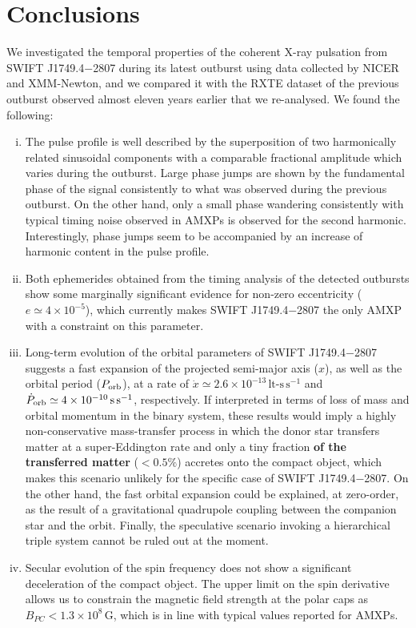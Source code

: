 \documentclass[fleqn,usenatbib]{mnras}
\newcommand{\swiftj}{SWIFT J1749.4$-$2807}
\newcommand{\nicer}{NICER}
\newcommand{\xmm}{XMM-Newton}
\newcommand{\rxte}{RXTE}
\begin{document}
\section{Conclusions}
We investigated the temporal properties of the coherent X-ray pulsation from \swiftj{} during its latest outburst using data collected by \nicer{} and \xmm{}, and we compared it with the \rxte{} dataset of the previous outburst observed almost eleven years earlier that we re-analysed. We found the following:

\begin{enumerate}[i)]
  \item The pulse profile is well described by the superposition of two harmonically related sinusoidal components with a comparable fractional amplitude which varies during the outburst. Large phase jumps are shown by the fundamental phase of the signal consistently to what was observed during the previous outburst. On the other hand, only a small phase wandering consistently with typical timing noise observed in AMXPs is observed for the second harmonic. Interestingly, phase jumps seem to be accompanied by an increase of harmonic content in the pulse profile. 
  \item Both ephemerides obtained from the timing analysis of the detected outbursts show some marginally significant evidence for non-zero eccentricity ($e\simeq4\times 10^{-5}$), which currently makes \swiftj{} the only AMXP with a constraint on this parameter.   
  \item Long-term evolution of the orbital parameters of \swiftj{} suggests a fast expansion of the projected semi-major axis ($x$), as well as the orbital period ($P_{\rm orb}$), at a rate of $\dot{x}\simeq 2.6\times 10^{-13}\,\text{lt-s}\,\text{s}^{-1}$ and $\dot{P}_{\rm orb}\simeq 4 \times 10^{-10}\,\text{s}\,\text{s}^{-1}$, respectively. If interpreted in terms of loss of mass and orbital momentum in the binary system, these results would imply a highly non-conservative mass-transfer process in which the donor star transfers matter at a super-Eddington rate and only a tiny fraction \textbf{of the transferred matter} ($< 0.5\%$) accretes onto the compact object, which makes this scenario unlikely for the specific case of \swiftj{}. On the other hand, the fast orbital expansion could be explained, at zero-order, as the result of a gravitational quadrupole coupling between the companion star and the orbit. Finally, the speculative scenario invoking a hierarchical triple system cannot be ruled out at the moment.  
  \item Secular evolution of the spin frequency does not show a significant deceleration of the compact object. The upper limit on the spin derivative allows us to constrain the magnetic field strength at the polar caps as $B_{PC}<1.3\times 10^{8}\,\text{G}$, which is in line with typical values reported for AMXPs.  
\end{enumerate}
\end{document}
